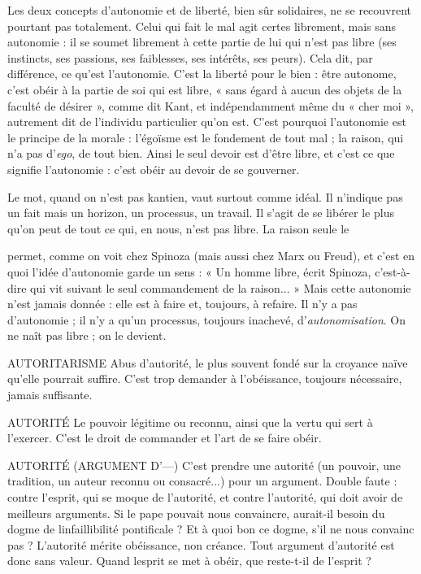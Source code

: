 Les deux concepts d’autonomie et de liberté, bien sûr solidaires, ne se
recouvrent pourtant pas totalement. Celui qui fait le mal agit certes librement,
mais sans autonomie : il se soumet librement à cette partie de lui qui n’est pas
libre (ses instincts, ses passions, ses faiblesses, ses intérêts, ses peurs). Cela dit,
par différence, ce qu’est l'autonomie. C’est la liberté pour le bien : être autonome,
c’est obéir à la partie de soi qui est libre, « sans égard à aucun des objets
de la faculté de désirer », comme dit Kant, et indépendamment même du
« cher moi », autrement dit de l’individu particulier qu’on est. C’est pourquoi
l’autonomie est le principe de la morale : l’égoïsme est le fondement de tout
mal ; la raison, qui n’a pas d’{\it ego}, de tout bien. Ainsi le seul devoir est d’être
libre, et c’est ce que signifie l’autonomie : c’est obéir au devoir de se gouverner.

Le mot, quand on n’est pas kantien, vaut surtout comme idéal. Il n’indique
pas un fait mais un horizon, un processus, un travail. Il s’agit de se libérer le
plus qu’on peut de tout ce qui, en nous, n’est pas libre. La raison seule le

permet, comme on voit chez Spinoza (mais aussi chez Marx ou Freud), et c’est
en quoi l’idée d'autonomie garde un sens : « Un homme libre, écrit Spinoza,
c’est-à-dire qui vit suivant le seul commandement de la raison... » Mais cette
autonomie n’est jamais donnée : elle est à faire et, toujours, à refaire. Il n’y a
pas d’autonomie ; il n’y a qu’un processus, toujours inachevé, d’{\it autonomisation}.
On ne naît pas libre ; on le devient.

AUTORITARISME Abus d'autorité, le plus souvent fondé sur la croyance
naïve qu’elle pourrait suffire. C’est trop demander à
l’obéissance, toujours nécessaire, jamais suffisante.

AUTORITÉ Le pouvoir légitime ou reconnu, ainsi que la vertu qui sert à
l'exercer. C’est le droit de commander et l’art de se faire obéir.

AUTORITÉ (ARGUMENT D’—) C'est prendre une autorité (un pouvoir, une
tradition, un auteur reconnu ou consacré...)
pour un argument. Double faute : contre l’esprit, qui se moque de
l'autorité, et contre l'autorité, qui doit avoir de meilleurs arguments. Si le pape
pouvait nous convaincre, aurait-il besoin du dogme de linfaillibilité
pontificale ? Et à quoi bon ce dogme, s’il ne nous convainc pas ?
L'autorité mérite obéissance, non créance. Tout argument d’autorité est
donc sans valeur. Quand lesprit se met à obéir, que reste-t-il de l'esprit ?

